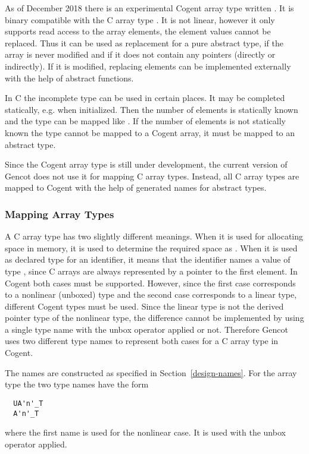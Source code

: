 As of December 2018 there is an experimental Cogent array type written . It is binary compatible 
with the C array type . It is not linear, however it only supports read access to the array elements, 
the element values cannot be replaced. Thus it can be used as replacement for a pure abstract type, if the array 
is never modified and if it does not contain any pointers (directly or indirectly). If it is modified, replacing
elements can be implemented externally with the help of abstract functions.

In C the incomplete type  can be used in certain places. It may be completed statically, e.g. 
when initialized. Then the number of elements is statically known and the type can be mapped like .
If the number of elements is not statically known the type cannot be mapped to a Cogent array, it must be mapped 
to an abstract type.

Since the Cogent array type is still under development, the current version of Gencot does not use it for
mapping C array types. Instead, all C array types are mapped to Cogent with the help of generated names for 
abstract types.

\subsubsection{Mapping Array Types}

A C array type  has two slightly different meanings. When it is used for allocating space in memory,
it is used to determine the required space as . When it is used as declared type for an 
identifier, it means that the identifier names a value of type , since C arrays are always represented
by a pointer to the first element. In Cogent both cases must be supported. However, since the first case 
corresponds to a nonlinear (unboxed) type and the second case corresponds to a linear type, different Cogent
types must be used. Since the linear type is not the derived pointer type of the nonlinear type, the 
difference cannot be implemented by using a single type name with the unbox operator applied or not. Therefore
Gencot uses two different type names to represent both cases for a C array type in Cogent.

The names are constructed as specified in Section~\ref{design-names}. For the array type  the two
type names have the form
\begin{verbatim}
  UA'n'_T
  A'n'_T
\end{verbatim}
where the first name is used for the nonlinear case. It is used with the unbox operator applied.


